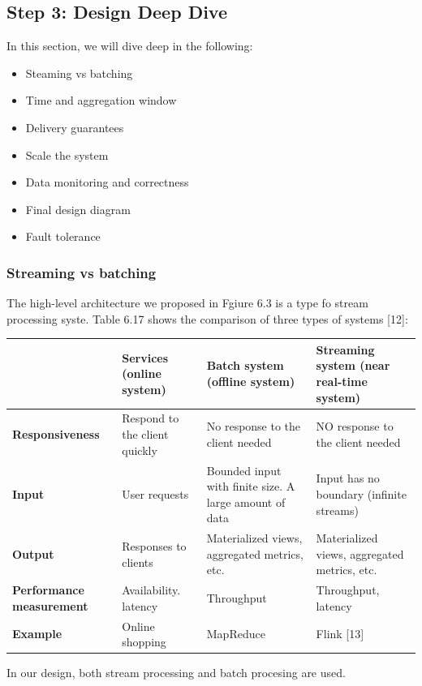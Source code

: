\documentclass{report}
\theoremstyle{definition}
\let\oldsubsection\subsection
\let\oldsubsubsection\subsubsection
\renewcommand{\subsection}{\oldsubsection*}
\renewcommand{\subsubsection}{\oldsubsubsection*}
\begin{document}
\subsection{Step 3: Design Deep Dive}

In this section, we will dive deep in the following:

\begin{itemize}
\item
Steaming vs batching
\item
Time and aggregation window
\item
Delivery guarantees
\item
Scale the system
\item
Data monitoring and correctness
\item
Final design diagram
\item
Fault tolerance
\end{itemize}

\subsubsection{Streaming vs batching}

The high-level architecture we proposed in Fgiure 6.3 is a type fo stream processing syste. Table 6.17 shows the comparison of three types of systems [12]:

\begin{tabular}{|p{3.5cm}|p{3.5cm}|p{3.5cm}|p{3.5cm}|}
\hline
       & Services (online system) & Batch system (offline system) & Streaming system (near real-time system) \\
\hline
\textbf{Responsiveness} & Respond to the client quickly & No response to the client needed & NO response to the client needed\\
\hline
\textbf{Input} & User requests & Bounded input with finite size. A large amount of data & Input has no boundary (infinite streams)\\
\hline
\textbf{Output} & Responses to clients & Materialized views, aggregated metrics, etc. & Materialized views, aggregated metrics, etc.\\
\hline
\textbf{Performance measurement} & Availability. latency & Throughput & Throughput, latency\\
\hline
\textbf{Example} & Online shopping & MapReduce & Flink [13]\\
\hline
\end{tabular}

In our design, both stream processing and batch procesing are used.
\end{document}
